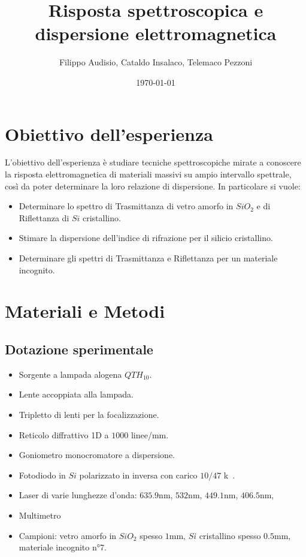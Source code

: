 \documentclass[a4paper,12pt]{article}
\title{\textbf{Risposta spettroscopica e dispersione elettromagnetica}}
\author{Filippo Audisio, Cataldo Insalaco, Telemaco Pezzoni}
\date{\today}
\begin{document}
\maketitle


\section{Obiettivo dell'esperienza}
L'obiettivo dell'esperienza è studiare tecniche spettroscopiche mirate a conoscere la risposta elettromagnetica di materiali massivi su ampio intervallo spettrale, così da poter determinare la loro relazione di dispersione. In particolare si vuole:
\begin{itemize}
    \item Determinare lo spettro di Trasmittanza di vetro amorfo in $SiO_2$ e di Riflettanza di $Si$ cristallino.
    \item Stimare la dispersione dell'indice di rifrazione per il silicio cristallino.
    \item Determinare gli spettri di Trasmittanza e Riflettanza per un materiale incognito.
\end{itemize}

\section{Materiali e Metodi}

\subsection{Dotazione sperimentale}
\begin{itemize}
    \item Sorgente a lampada alogena $QTH_{10}$.
    \item Lente accoppiata alla lampada.
    \item Tripletto di lenti per la focalizzazione.
    \item Reticolo diffrattivo 1D a $1000$ \unit{linee/mm}.
    \item Goniometro monocromatore a dispersione.
    \item Fotodiodo in $Si$ polarizzato in inversa con carico $10/47$ \unit{k\Omega}.
    \item Laser di varie lunghezze d'onda: $635.9$\unit{nm}, $532$\unit{nm}, $449.1$\unit{nm}, $406.5$\unit{nm},
    \item Multimetro
    \item Campioni: vetro amorfo in $SiO_2$ spesso $1$\unit{mm}, $Si$ cristallino spesso $0.5$\unit{mm}, materiale incognito n°7.
\end{itemize}
\end{document}
